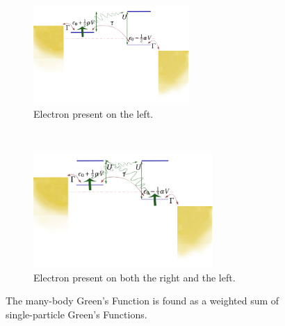 \begin{frame}
\begin{figure}[!b]
         
        \begin{subfigure}{0.45\textwidth}\centering
            \includegraphics[clip=true,trim=0cm 1cm 0cm 0cm, width=0.65\textwidth]{fig/interacting_schematics2.pdf}
            \caption{Electron present on the left.}
        \end{subfigure}~ 
        \begin{subfigure}{0.45\textwidth}\centering
            \includegraphics[clip=true,trim=0cm 1cm 0cm 0cm, width=0.75\textwidth]{fig/interacting_schematics3.pdf}
            \caption{Electron present on both the right and the left.}
        \end{subfigure}
        \caption{The many-body Green's Function is found as a weighted sum of single-particle Green's Functions.} 
    \end{figure} 
\end{frame}  
